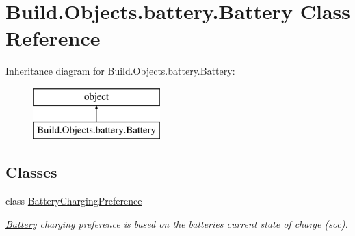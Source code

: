 \hypertarget{class_build_1_1_objects_1_1battery_1_1_battery}{}\section{Build.\+Objects.\+battery.\+Battery Class Reference}
\label{class_build_1_1_objects_1_1battery_1_1_battery}
Inheritance diagram for Build.\+Objects.\+battery.\+Battery\+:\begin{figure}[H]
\begin{center}
\leavevmode
\includegraphics[height=2.000000cm]{class_build_1_1_objects_1_1battery_1_1_battery}
\end{center}
\end{figure}
\subsection*{Classes}
\begin{DoxyCompactItemize}
\item 
class \hyperlink{class_build_1_1_objects_1_1battery_1_1_battery_1_1_battery_charging_preference}{Battery\+Charging\+Preference}
\begin{DoxyCompactList}\small\item\em \hyperlink{class_build_1_1_objects_1_1battery_1_1_battery}{Battery} charging preference is based on the batteries current state of charge (soc). \end{DoxyCompactList}\end{DoxyCompactItemize}
